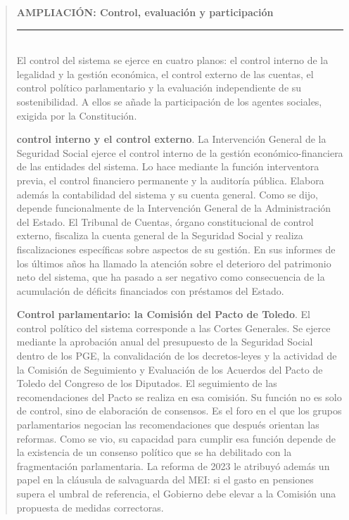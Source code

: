 \documentclass[10pt,a4paper]{article}
\newenvironment{specialblock}[1]{%
      \begin{quote} %
      \small %
      \noindent\textbf{#1}\\[-0.3em] %
      \rule{\linewidth}{0.4pt}\\[0.6em]}{
      \end{quote}}
\begin{document}
\begin{specialblock}{\textbf{AMPLIACIÓN:} Control, evaluación y participación}
    El control del sistema se ejerce en cuatro planos: el control interno de la legalidad y la gestión económica, el control externo de las cuentas, el control político parlamentario y la evaluación independiente de su sostenibilidad. A ellos se añade la participación de los agentes sociales, exigida por la Constitución.

    \textbf{control interno y el control externo}. La Intervención General de la Seguridad Social ejerce el control interno de la gestión económico-financiera de las entidades del sistema. Lo hace mediante la función interventora previa, el control financiero permanente y la auditoría pública. Elabora además la contabilidad del sistema y su cuenta general. Como se dijo, depende funcionalmente de la Intervención General de la Administración del Estado. El Tribunal de Cuentas, órgano constitucional de control externo, fiscaliza la cuenta general de la Seguridad Social y realiza fiscalizaciones específicas sobre aspectos de su gestión. En sus informes de los últimos años ha llamado la atención sobre el deterioro del patrimonio neto del sistema, que ha pasado a ser negativo como consecuencia de la acumulación de déficits financiados con préstamos del Estado. 

    \textbf{Control parlamentario: la Comisión del Pacto de Toledo}. El control político del sistema corresponde a las Cortes Generales. Se ejerce mediante la aprobación anual del presupuesto de la Seguridad Social dentro de los PGE, la convalidación de los decretos-leyes y la actividad de la Comisión de Seguimiento y Evaluación de los Acuerdos del Pacto de Toledo del Congreso de los Diputados. El seguimiento de las recomendaciones del Pacto se realiza en esa comisión. Su función no es solo de control, sino de elaboración de consensos. Es el foro en el que los grupos parlamentarios negocian las recomendaciones que después orientan las reformas. Como se vio, su capacidad para cumplir esa función depende de la existencia de un consenso político que se ha debilitado con la fragmentación parlamentaria. La reforma de 2023 le atribuyó además un papel en la cláusula de salvaguarda del MEI: si el gasto en pensiones supera el umbral de referencia, el Gobierno debe elevar a la Comisión una propuesta de medidas correctoras.


\end{specialblock}
\end{document}
